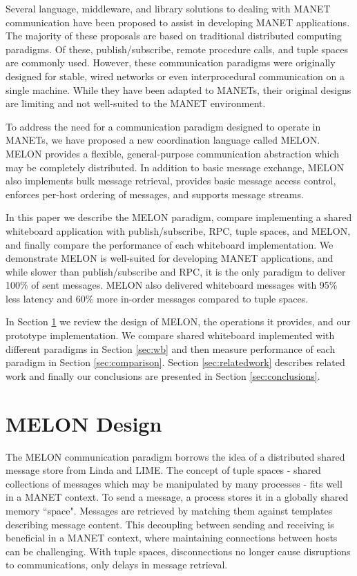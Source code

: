 \documentclass{llncs}
\begin{document}
Several language, middleware, and library solutions to dealing with MANET communication have been proposed to assist in developing MANET applications. The majority of these proposals are based on traditional distributed computing paradigms\cite{mine}. Of these, publish/subscribe, remote procedure calls, and tuple spaces are commonly used. However, these communication paradigms were originally designed for stable, wired networks or even interprocedural communication on a single machine. While they have been adapted to MANETs, their original designs are limiting and not well-suited to the MANET environment\cite{collins2010quantitative}.

To address the need for a communication paradigm designed to operate in MANETs, we have proposed a new coordination language called MELON\cite{melon}. MELON provides a flexible, general-purpose communication abstraction which may be completely distributed. In addition to basic message exchange, MELON also implements bulk message retrieval, provides basic message access control, enforces per-host ordering of messages, and supports message streams.

In this paper we describe the MELON paradigm, compare implementing a shared whiteboard application with publish/subscribe, RPC, tuple spaces, and MELON, and finally compare the performance of each whiteboard implementation. We demonstrate MELON is well-suited for developing MANET applications, and while slower than publish/subscribe and RPC, it is the only paradigm to deliver 100\% of sent messages. MELON also delivered whiteboard messages with 95\% less latency and 60\% more in-order messages compared to tuple spaces.

In Section \ref{sec:design} we review the design of MELON, the operations it provides, and our prototype implementation. We compare shared whiteboard implemented with different paradigms in Section \ref{sec:wb} and then measure performance of each paradigm in Section \ref{sec:comparison}. Section \ref{sec:relatedwork} describes related work and finally our conclusions are presented in Section \ref{sec:conclusions}.

\section{MELON Design}\label{sec:design}

The MELON communication paradigm borrows the idea of a distributed shared message store from Linda\cite{linda} and LIME\cite{lime}. The concept of tuple spaces - shared collections of messages which may be manipulated by many processes - fits well in a MANET context. To send a message, a process stores it in a globally shared memory ``space". Messages are retrieved by matching them against templates describing message content. This decoupling between sending and receiving is beneficial in a MANET context, where maintaining connections between hosts can be challenging. With tuple spaces, disconnections no longer cause disruptions to communications, only delays in message retrieval.
\end{document}
